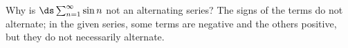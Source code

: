 {Why is $\ds\sum_{n=1}^\infty \sin n$ not an alternating series?
}
{The signs of the terms do not alternate; in the given series, some terms are negative and the others positive, but they do not necessarily alternate.
}